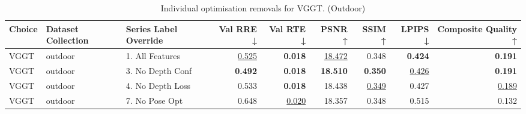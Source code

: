 \begin{table}[H]
\caption{\ifdefined\customcaption \customcaption \else Individual optimisation removals for VGGT. (Outdoor) \fi}
\label{tab:99_all_improvements_removals_vggt_outdoor}
\centering
\scriptsize
\begin{tabular}{lllrrrrrr}
\toprule
Choice & Dataset Collection & Series Label Override & Val RRE ↓ & Val RTE ↓ & PSNR ↑ & SSIM ↑ & LPIPS ↓ & Composite Quality ↑ \\
\midrule
VGGT & outdoor & 1. All Features & \underline{0.525} & \textbf{0.018} & \underline{18.472} & 0.348 & \textbf{0.424} & \textbf{0.191} \\
VGGT & outdoor & 3. No Depth Conf & \textbf{0.492} & \textbf{0.018} & \textbf{18.510} & \textbf{0.350} & \underline{0.426} & \textbf{0.191} \\
VGGT & outdoor & 4. No Depth Loss & 0.533 & \textbf{0.018} & 18.438 & \underline{0.349} & 0.427 & \underline{0.189} \\
VGGT & outdoor & 7. No Pose Opt & 0.648 & \underline{0.020} & 18.357 & 0.348 & 0.515 & 0.132 \\
\bottomrule
\end{tabular}
\end{table}